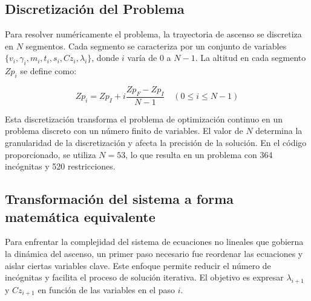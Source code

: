 \documentclass[fleqn]{article}
\begin{document}
\subsection{Discretización del Problema}

Para resolver numéricamente el problema, la trayectoria de ascenso se discretiza en $N$ segmentos. Cada segmento se caracteriza por un conjunto de variables $\{v_i, \gamma_i, m_i, t_i, s_i, Cz_i, \lambda_i\}$, donde $i$ varía de 0 a $N-1$.  La altitud en cada segmento $Zp_i$ se define como:

\begin{equation}
    Zp_i = Zp_I + i \frac{Zp_F - Zp_I}{N-1} \quad (0 \leq i \leq N-1)
\end{equation}

Esta discretización transforma el problema de optimización continuo en un problema discreto con un número finito de variables.  El valor de $N$ determina la granularidad de la discretización y afecta la precisión de la solución.  En el código proporcionado, se utiliza $N = 53$, lo que resulta en un problema con 364 incógnitas y 520 restricciones.

\subsection{Transformación del sistema a forma matemática equivalente}

Para enfrentar la complejidad del sistema de ecuaciones no lineales que gobierna la dinámica del ascenso, un primer paso necesario fue reordenar las ecuaciones y aislar ciertas variables clave. Este enfoque permite reducir el número de incógnitas y facilita el proceso de solución iterativa.  El objetivo es expresar $\lambda_{i+1}$ y $Cz_{i+1}$ en función de las variables en el paso $i$.
\end{document}
